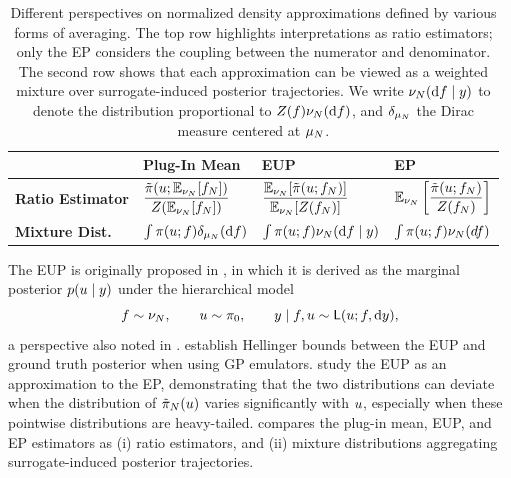 \documentclass[12pt]{article}
\begin{document}
\begin{table}
\centering
\begin{tabular}{>{\raggedright\arraybackslash}p{2.2cm} >{\centering\arraybackslash}p{3.8cm} >{\centering\arraybackslash}p{4.2cm} >{\centering\arraybackslash}p{4.2cm}}
\toprule
& \textbf{Plug-In Mean} & \textbf{EUP} & \textbf{EP} \\
\midrule
\textbf{Ratio Estimator} & 
$\displaystyle \frac{\tilde{\pi}(u; \mathbb{E}_{\nu_{N}}[f_{N}])}{Z(\mathbb{E}_{\nu_{N}}[f_{N}])}$ &
$\displaystyle \frac{\mathbb{E}_{\nu_{N}}[\tilde{\pi}(u; f_{N})]}{\mathbb{E}_{\nu_{N}}[Z(f_{N})]}$ &
$\displaystyle \mathbb{E}_{\nu_{N}}\left[\frac{\tilde{\pi}(u; f_{N})}{Z(f_{N})}\right]$ \\ [4ex]

\textbf{Mixture Dist.} & 
$\int \postDensNorm(\Par; \targetTraj) \delta_{\emMean}(\d\targetTraj)$ & 
$\int \postDensNorm(\Par; \targetTraj) \emDist(\d\targetTraj \given \obs)$ & 
$ \int \pi(u; f) \nu_{N}(df)$ \\
\bottomrule
\end{tabular}
\caption{Different perspectives on normalized density approximations defined by various forms of averaging.
	     The top row highlights interpretations as ratio estimators; only the EP considers the 
	     coupling between the numerator and denominator. The second row shows that each
	     approximation can be viewed as a weighted mixture over surrogate-induced posterior 
	     trajectories. We write $\emDist(\d\targetTraj \given \obs)$ to denote the distribution
	     proportional to $\normCst(\targetTraj) \emDist(\d\targetTraj)$, and $\delta_{\mu_{N}}$
	     the Dirac measure centered at $\mu_{N}$.}
\label{tab:post-approx-comparison}
\end{table}

The EUP is originally proposed in \citet{BilionisBayesSurrogates}, in which it is derived as 
the marginal posterior $p(u \mid y)$ under the hierarchical model
\begin{equation}
\targetTraj  \sim \emDist, \qquad 
\Par \sim \priorDens, \qquad
\obs \given \targetTraj, \Par \sim \lik(\Par; \targetTraj, \d\obs),
\label{eq:eup-prob-model}
\end{equation}
a perspective also noted in \citet{SinsbeckNowak,StuartTeck1,StuartTeck2,ourSurrPropPaper}.
\citet{StuartTeck1,StuartTeck2,random_fwd_models} establish Hellinger bounds between the EUP
and ground truth posterior when using GP emulators.
 \citet{ourSurrPropPaper} study the EUP as an approximation
to the EP, demonstrating that the two distributions can deviate when 
the distribution of ${\tilde{\pi}}_{N}(u)$ varies significantly with $u$, especially when these pointwise
distributions are heavy-tailed.
  compares the plug-in mean, EUP,
and EP estimators as (i) ratio estimators, and (ii) mixture distributions aggregating surrogate-induced
posterior trajectories. 
\end{document}
